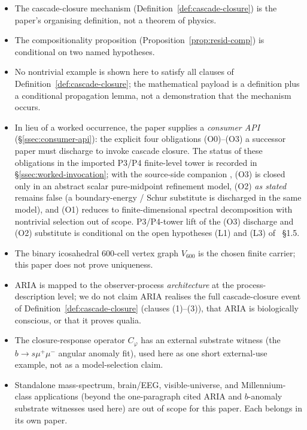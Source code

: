 \documentclass[11pt]{article}
\theoremstyle{definition}
\newcommand{\pphi}{\varphi}
\newcommand{\Vsub}{V_{600}}
\newcommand{\Cphi}{C_{\pphi}}
\begin{document}
\begin{tcolorbox}[title=\textbf{Epistemic status (read first)}]
\begin{itemize}[leftmargin=*]
\item The cascade-closure mechanism (Definition~\ref{def:cascade-closure})
  is the paper's organising definition, not a theorem of physics.
\item The compositionality proposition (Proposition~\ref{prop:resid-comp})
  is conditional on two named hypotheses.
\item No nontrivial example is shown here to satisfy all clauses of
  Definition~\ref{def:cascade-closure}; the mathematical payload is
  a definition plus a conditional propagation lemma, not a
  demonstration that the mechanism occurs.
\item In lieu of a worked occurrence, the paper supplies a
  \emph{consumer API} (\S\ref{ssec:consumer-api}): the explicit
  four obligations (O0)--(O3) a successor paper must discharge to
  invoke cascade closure. The status of these obligations in the
  imported P3/P4 finite-level tower is recorded in
  \S\ref{ssec:worked-invocation}; with the source-side companion
  \cite{CascadeRefinementCompat}, (O3) is closed only in an
  abstract scalar pure-midpoint refinement model, (O2) \emph{as
  stated} remains false (a boundary-energy / Schur substitute is
  discharged in the same model), and (O1) reduces to finite-dimensional
  spectral decomposition with nontrivial selection out of scope.
  P3/P4-tower lift of the (O3) discharge and (O2) substitute is
  conditional on the open hypotheses (L1) and (L3) of
  \cite{CascadeRefinementCompat}~\S1.5.
\item The binary icosahedral 600-cell vertex graph $\Vsub$ is the chosen
  finite carrier; this paper does not prove uniqueness.
\item ARIA is mapped to the observer-process \emph{architecture} at
  the process-description level; we do not claim ARIA realises the
  full cascade-closure event of Definition~\ref{def:cascade-closure}
  (clauses (1)--(3)), that ARIA is biologically conscious, or that it
  proves qualia.
\item The closure-response operator $\Cphi$ has an external substrate
  witness (the \(b\to s\mu^+\mu^-\) angular anomaly fit), used here
  as one short external-use example, not as a model-selection claim.
\item Standalone mass-spectrum, brain/EEG, visible-universe, and
  Millennium-class applications (beyond the one-paragraph cited
  ARIA and $b$-anomaly substrate witnesses used here) are out of
  scope for this paper. Each belongs in its own paper.
\end{itemize}
\end{tcolorbox}
\end{document}
